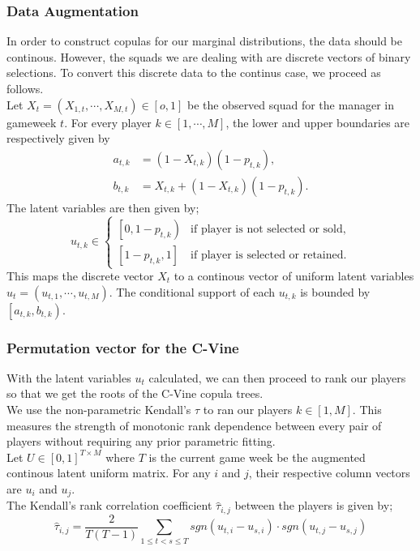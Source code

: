 \documentclass[12pt,oneside,a4paper]{book}
\theoremstyle{definition}
\theoremstyle{remark}
\begin{document}
				\subsubsection{Data Augmentation}
				In order to construct copulas for our marginal distributions, the data should be continous. However, the squads we are dealing with are discrete vectors of binary selections. To convert this discrete data to the continus case, we proceed as follows.\\
				Let $X_t = \left( X_{1,t}, \cdots, X_{M,t} \right) \in \left[o,1\right]$ be the observed squad for the manager in gameweek $t$. For every player $k \in [1, \cdots, M]$, the lower and upper boundaries are respectively given by
				\begin{equation}\label{Eq:latent_boundaries}
					\begin{aligned}
						a_{t,k} &= \left(1-X_{t,k}\right) \left(1-p_{t,k}\right),\\
						b_{t,k} &= X_{t,k} + \left(1-X_{t,k}\right) \left(1-p_{t,k}\right).
					\end{aligned}
				\end{equation}
				The latent variables are then given by;
				\begin{equation}\label{Eq:latent_variables}
					u_{t,k} \in
					\begin{cases}
						\left[0,1-p_{t,k}\right) & \text{if player is not selected or sold},\\
						\left[1-p_{t,k}, 1\right] &\text{if player is selected or retained}.
					\end{cases}
				\end{equation}
				This maps the discrete vector $X_t$ to a continous vector of uniform latent variables $u_{t} = \left(u_{t,1}, \cdots, u_{t,M}\right)$. The conditional support of each $u_{t,k}$ is bounded by $\left[a_{t,k},b_{t,k}\right)$.

				\subsubsection{Permutation vector for the C-Vine}
				With the latent variables $u_t$ calculated, we can then proceed to rank our players so that we get the roots of the C-Vine copula trees.\\
				We use the non-parametric Kendall's $\tau$ to ran our players $k \in [1,M]$. This measures the strength of monotonic rank dependence between every pair of players without requiring any prior parametric fitting.\\
				Let $U\in \left[0,1\right]^{T \times M}$ where $T$ is the current game week be the augmented continous latent uniform matrix. For any $i$ and $j$, their respective column vectors are $u_i$ and $u_j$.\\
				The Kendall's rank correlation coefficient $\hat{\tau}_{i,j}$ between the players is given by;
				\begin{equation}\label{Eq:kendall_tau}
					\hat{\tau}_{i,j} = \frac{2}{T\left(T-1\right)}\sum_{1\leqslant t < s \leqslant T}sgn\left(u_{t,i} - u_{s,i}\right)\cdot sgn\left(u_{t,j} - u_{s,j}\right)
				\end{equation}
\end{document}
